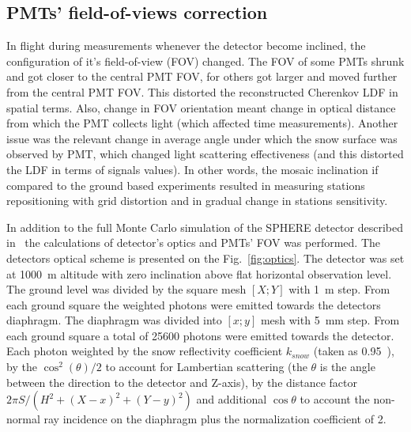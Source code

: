 \documentclass[final,5p,times,twocolumn]{elsarticle}
\begin{document}
\subsection{PMTs' field-of-views correction}

In flight during measurements whenever the detector become inclined, the configuration of it's field-of-view (FOV) changed. The FOV of some PMTs shrunk and got closer to the central PMT FOV, for others got larger and moved further from the central PMT FOV. This distorted the reconstructed Cherenkov LDF in spatial terms. Also, change in FOV orientation meant change in optical distance from which the PMT collects light (which affected time measurements). Another issue was the relevant change in average angle under which the snow surface was observed by PMT, which changed light scattering effectiveness (and this distorted the LDF in terms of signals values). In other words, the mosaic inclination if compared to the ground based experiments resulted in measuring stations repositioning with grid distortion and in gradual change in stations sensitivity.

In addition to the full Monte Carlo simulation of the SPHERE detector described in~\cite{Ant19} the calculations of detector's optics and PMTs' FOV was performed. The detectors optical scheme is presented on the Fig.~\ref{fig:optics}. %
The detector was set at 1000~m altitude with zero inclination above flat horizontal observation level. The ground level was divided by the square mesh $[X;Y]$ with 1~m step. From each ground square the weighted photons were emitted towards the detectors diaphragm. The diaphragm was divided into $[x;y]$ mesh with 5~mm step. From each ground square a total of 25600 photons were emitted towards the detector. Each photon weighted by the snow reflectivity coefficient $k_{snow}$ (taken as 0.95~\cite{war82}), by the $\cos^2(\theta)/2$ to account for Lambertian scattering (the $\theta$ is the angle between the direction to the detector and Z-axis), by the distance factor $2\pi{}S/(H^2+(X-x)^2+(Y-y)^2)$ and additional $\cos\theta$ to account the non-normal ray incidence on the diaphragm {\color{red}plus} the normalization coefficient of 2.
\end{document}
